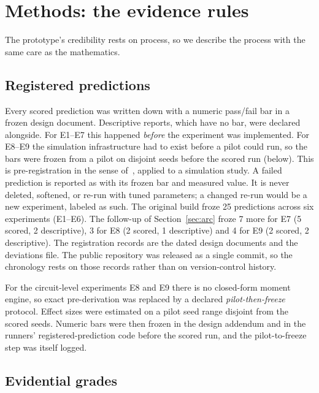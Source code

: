 \section{Methods: the evidence rules}
\label{sec:methods}

The prototype's credibility rests on process, so we describe the process with the same care as the mathematics.

\subsection{Registered predictions}
\label{sec:methods-registration}

Every scored prediction was written down with a numeric pass/fail bar in a frozen design document. Descriptive reports, which have no bar, were declared alongside. For E1--E7 this happened \emph{before} the experiment was implemented. For E8--E9 the simulation infrastructure had to exist before a pilot could run, so the bars were frozen from a pilot on disjoint seeds before the scored run (below). This is pre-registration in the sense of~\cite{nosek2018preregistration}, applied to a simulation study. A failed prediction is reported as \gRegNeg{} with its frozen bar and measured value. It is never deleted, softened, or re-run with tuned parameters; a changed re-run would be a new experiment, labeled as such. The original build froze 25 predictions across six experiments (E1--E6). The follow-up of Section~\ref{sec:arc} froze 7 more for E7 (5 scored, 2 descriptive), 3 for E8 (2 scored, 1 descriptive) and 4 for E9 (2 scored, 2 descriptive). %
The registration records are the dated design documents and the deviations file. The public repository was released as a single commit, so the chronology rests on those records rather than on version-control history. %

For the circuit-level experiments E8 and E9 there is no closed-form moment engine, so exact pre-derivation was replaced by a declared \emph{pilot-then-freeze} protocol. Effect sizes were estimated on a pilot seed range disjoint from the scored seeds. Numeric bars were then frozen in the design addendum and in the runners' registered-prediction code before the scored run, and the pilot-to-freeze step was itself logged. %

\subsection{Evidential grades}
\label{sec:methods-grades}

